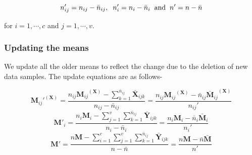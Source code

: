 \begin{equation}
\label{eqn:n_Dec}
n'_{ij} = n_{ij} - \bar{n}_{ij}, \hspace{0.2cm} n'_i = n_i - \bar{n}_i \hspace{0.2cm} \text{and} \hspace{0.2cm} n' = n - \bar{n}
\end{equation}

for $i = 1, \cdots, c$ and $j = 1, \cdots, v$.



\subsubsection{Updating the means}
\label{ssubs:2DMvIDDA_Inc_M}
We update all the older means to reflect the change due to the deletion of new data samples. The update equations are as follows-

\begin{equation}
\label{eqn:Mij_Dec}
{\textbf{M}_{ij}'}^{(\textbf{X})} = \frac{n_{ij} {\textbf{M}_{ij}}^{(\textbf{X})} - \sum\limits_{k=1}^{\bar{n}_{ij}} \bar{\textbf{X}}_{ijk}}{n_{ij} - \bar{n}_{ij}} = \frac{ n_{ij} {\textbf{M}_{ij}}^{(\textbf{X})} - \bar{n}_{ij} {\bar{\textbf{M}}_{ij}}^{(\textbf{X})}} {n_{ij}'}
\end{equation}
\begin{equation}
\label{eqn:Mi_Dec}
\textbf{M}'_{i} = \frac{n_i \textbf{M}_{i} - \sum\limits_{j=1}^{v} \sum\limits_{k=1}^{\bar{n}_{ij}} \bar{\textbf{Y}}_{ijk}}{n_i - \bar{n}_i} = \frac{n_i \textbf{M}_{i} - \bar{n}_i\bar{\textbf{M}}_{i}}{n_i'} \end{equation}
\begin{equation}
\label{eqn:M_Dec}
\textbf{M}' = \frac{n \textbf{M} - \sum\limits_{i=1}^{c} \sum\limits_{j=1}^{v} \sum\limits_{k=1}^{\bar{n}_{ij}} \bar{\textbf{Y}}_{ijk}}{n-\bar{n}} = \frac{n \textbf{M} - \bar{n} \bar{\textbf{M}}}{n'}
\end{equation}



